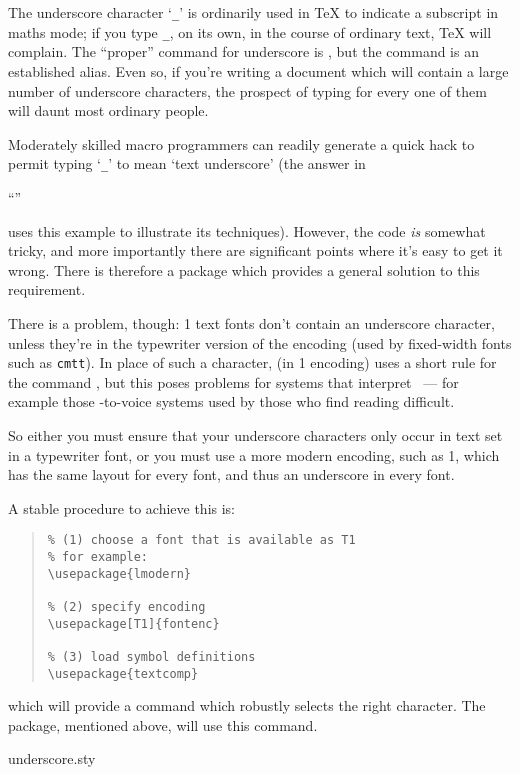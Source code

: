 
The underscore character `\texttt{\_}' is ordinarily used in \TeX{} to
indicate a subscript in maths mode; if you type \texttt{\_}, on its
own, in the course of ordinary text, \TeX{} will complain.  The
``proper'' \latex{} command for underscore is ,
but the \latexo{} command \csx{\_} is an established alias.  Even so,
if you're writing a document which will contain a large number of
underscore characters, the prospect of typing \csx{\_} for every one
of them will daunt most ordinary people.

Moderately skilled macro programmers can readily generate a quick hack
to permit typing `\texttt{\_}' to mean `text underscore' (the answer in
\begin{hyperversion}
  ``''
\end{hyperversion}
\begin{flatversion}
\end{flatversion}
uses this example to illustrate its techniques).
However, the code \emph{is} somewhat tricky, and more importantly
there are significant points where it's easy to get it wrong.  There
is therefore a package  which provides a general
solution to this requirement.

There is a problem, though: 1 text fonts don't contain an
underscore character, unless they're in the typewriter version of the
encoding (used by fixed-width fonts such as \texttt{cmtt}).  In place
of such a character, \latex{} (in 1 encoding) uses a short rule
for the command , but this poses problems
for systems that interpret ~--- for example those
-to-voice systems used by those who find reading difficult.

So either you must ensure that your underscore characters only occur
in text set in a typewriter font, or you must use a more modern
encoding, such as 1, which has the same layout for every font,
and thus an underscore in every font.

A stable procedure to achieve this is:
\begin{quote}
\begin{verbatim}
% (1) choose a font that is available as T1
% for example:
\usepackage{lmodern}

% (2) specify encoding
\usepackage[T1]{fontenc}

% (3) load symbol definitions
\usepackage{textcomp}
\end{verbatim}
\end{quote}
which will provide a command  which robustly
selects the right character.  The  package,
mentioned above, will use this command.
\begin{ctanrefs}
\item[underscore.sty]
\end{ctanrefs}

